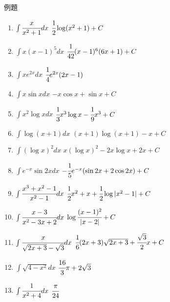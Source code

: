 \documentclass[10pt,dvipdfmx]{jsarticle}
\newcommand{\answer}[2]{{\color{orange}#2}}
\newcommand{\answer}[2]{\vspace{#1mm}}
\begin{document}
\begin{itembox}[l]{例題}
  \begin{large}
    \begin{enumerate}
      \item $\int \cfrac{x}{x^2+1}dx$ \answer{10}{$\cfrac{1}{2}\log (x^2+1)+C$}
      \item $\int x(x-1)^5dx$ \answer{10}{$\cfrac{1}{42}(x-1)^6(6x+1)+C$}
      \item $\int xe^{2x}dx$ \answer{10}{$\cfrac{1}{4}e^{2x}(2x-1) $}
      \item $\int x\sin xdx$ \answer{10}{$-x\cos x+\sin x+C $}
      \item $\int x^2\log xdx$ \answer{10}{$\cfrac{1}{3}x^3\log x-\cfrac{1}{9}x^3+C $}
      \item $\int \log(x+1)dx$ \answer{10}{$(x+1)\log(x+1)-x+C $}
      \item $\int (\log x)^2dx$ \answer{10}{$x(\log x)^2-2x\log x+2x+C $}
      \item $\int e^{-x}\sin 2xdx$ \answer{10}{$-\cfrac{1}{5} e^{-x}(\sin 2x+2\cos 2x)+C$}
      \item $\int \cfrac{x^3+x^2-1}{x^2-1}dx$ \answer{10}{$\cfrac{1}{2}x^2+x+\cfrac{1}{2}\log |x^2-1|+C $}
      \item $\int \cfrac{x-3}{x^2-3x+2}dx$ \answer{10}{$ \log \cfrac{(x-1)^2}{|x-2|}+C$}
      \item $\int \cfrac{x}{\sqrt{2x+3}-\sqrt{3}}dx$ \answer{10}{$\cfrac{1}{6}(2x+3)\sqrt{2x+3}+\cfrac{\sqrt{3}}{2}x+C $}
      \item $\int \sqrt{4-x^2}dx$ \answer{10}{$ \cfrac{16}{3}\pi +2\sqrt{3}$}
      \item $\int \cfrac{1}{x^2+4}dx$ \answer{10}{$\cfrac{\pi}{24} $}
    \end{enumerate}
  \end{large}
\end{itembox}
\end{document}

